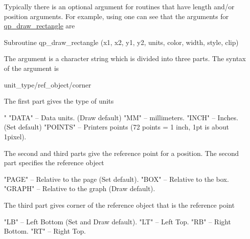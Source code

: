Typically there is an optional  argument for \quickplot routines that
have length and/or position arguments. For example, using  one can
see that the arguments for \hyperref[r:qp.draw.rectangle]{qp_draw_rectangle} are
\begin{example}
  Subroutine qp_draw_rectangle (x1, x2, y1, y2, units, color, width, style, clip)
\end{example}
The  argument is a character string which is divided into three
parts. The syntax of the  argument is
\begin{example}
  unit_type/ref_object/corner
\end{example}
The first part  gives the type of units
\begin{example}
  "%
  "DATA"    -- Data units. (Draw default)
  "MM"      -- millimeters.
  "INCH"    -- Inches. (Set default)
  "POINTS"  -- Printers points (72 points = 1 inch, 1pt is about 1pixel).
\end{example}
The second and third parts give the reference point for a position.
The second part specifies the reference object
\begin{example}
    "PAGE"  -- Relative to the page (Set default).
    "BOX"   -- Relative to the box.
    "GRAPH" -- Relative to the graph (Draw default).
\end{example}
The third part gives corner of the reference object that is the reference point
\begin{example}
    "LB"    -- Left Bottom (Set and Draw default).
    "LT"    -- Left Top.
    "RB"    -- Right Bottom.
    "RT"    -- Right Top.
\end{example}

